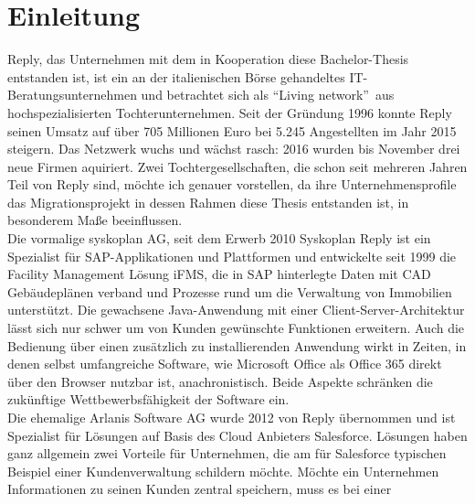 \section{Einleitung}
Reply, das Unternehmen mit dem in Kooperation diese Bachelor-Thesis 
entstanden ist, ist ein an der italienischen Börse gehandeltes 
IT-Beratungsunternehmen und betrachtet sich 
als "`Living network"'\ aus hochspezialisierten Tochterunternehmen. Seit der 
Gründung 1996 konnte Reply seinen Umsatz auf über 705 Millionen Euro bei 5.245 
Angestellten im Jahr 2015 steigern. Das Netzwerk wuchs und wächst rasch: 
2016 wurden bis November drei neue Firmen aquiriert. Zwei 
Tochtergesellschaften, die schon seit mehreren Jahren Teil von Reply sind, 
möchte ich genauer vorstellen, da ihre Unternehmensprofile das 
Migrationsprojekt in dessen Rahmen diese Thesis entstanden ist, in besonderem 
Maße beeinflussen. \\
Die vormalige syskoplan AG, seit dem Erwerb 2010 
Syskoplan Reply ist ein Spezialist für SAP-Applikationen und 
Plattformen und entwickelte seit 1999 die Facility 
Management Lösung iFMS, die in SAP hinterlegte Daten mit CAD Gebäudeplänen 
verband und Prozesse rund um die Verwaltung von Immobilien unterstützt. Die 
gewachsene Java-Anwendung mit einer Client-Server-Architektur lässt sich nur 
schwer um von Kunden gewünschte Funktionen erweitern. Auch die Bedienung über 
einen zusätzlich zu installierenden Anwendung wirkt in Zeiten, in denen selbst 
umfangreiche Software, wie Microsoft Office als Office 365 direkt über den 
Browser nutzbar ist, anachronistisch. Beide Aspekte schränken die zukünftige
Wettbewerbsfähigkeit der Software ein. \\
Die ehemalige Arlanis Software AG wurde 2012 von Reply übernommen und ist 
Spezialist für Lösungen auf Basis des Cloud Anbieters Salesforce. Lösungen 
haben ganz allgemein zwei Vorteile für Unternehmen, die am für Salesforce 
typischen Beispiel einer Kundenverwaltung schildern möchte. Möchte ein 
Unternehmen Informationen zu seinen Kunden zentral speichern, muss es bei einer 

